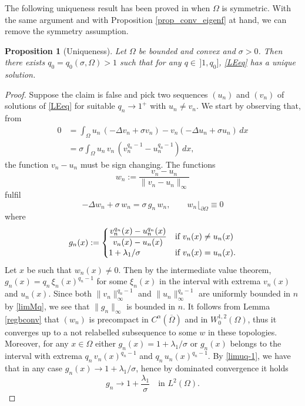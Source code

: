 \documentclass[12pt]{amsart}
\numberwithin{equation}{section}
\theoremstyle{plain}
\theoremstyle{plain}
\newtheorem{proposition}[theorem]{Proposition}
\theoremstyle{plain}
\theoremstyle{definition}
\newcommand{\beq}{\begin{equation}}
\newcommand{\eeq}{\end{equation}}
\begin{document}
\smallskip

The following uniqueness result has been proved in \cite{DGP99} when $\Omega$ is symmetric. With the same argument and with Proposition \ref{prop_conv_eigenf} at hand, we can remove the symmetry assumption.

\begin{proposition}[Uniqueness]
\label{corol_uniq}
Let $\Omega$ be bounded and convex and $\sigma>0$. 
Then there exists $q_0=q_0(\sigma, \Omega)>1$ such that for any $q\in \, ]1, q_0]$, \eqref{LEeq} has a unique solution.
\end{proposition}

\begin{proof}
Suppose the claim is false and pick two sequences $(u_n)$ and $(v_n)$ of solutions of \eqref{LEeq} for suitable $q_n\to 1^+$ with $u_n\ne v_n$. 
We start by observing that, from 
\[
\begin{split}
0&=\int_\Omega u_n\, (-\Delta v_n+\sigma v_n)- v_n(-\Delta u_n+\sigma u_n)\, dx\\
&=\sigma \int_\Omega u_n\, v_n\, (v_n^{q_n-1}-u_n^{q_n-1})\, dx,
\end{split}
\]
the function $v_n-u_n$ must be sign changing. 
The functions 
\[
w_n:=\frac{v_n-u_n}{\|v_n-u_n\|_\infty}
\]
fulfil
\beq
\label{eqwn}
-\Delta w_n +\sigma\, w_n=\sigma\, g_n\, w_n, \qquad w_n\lfloor_{\partial\Omega}\equiv 0
\eeq
where
\[
g_n(x):=
\begin{cases}\dfrac{v_n^{q_n}(x)-u_n^{q_n}(x)}{v_n(x)-u_n(x)}&\text{if $v_n(x)\ne u_n(x)$}\\
1+\lambda_1/\sigma&\text{if $ v_n(x)=u_n(x)$}.
\end{cases}
\]
Let $x$ be such that $w_n(x)\ne 0$. 
Then by the intermediate value theorem, $g_n(x)= q_n\, \xi_n(x)^{q_n-1}$ for some $\xi_n(x)$ in the interval with extrema $v_n(x)$ and $u_n(x)$. 
Since both $\|v_n\|_\infty^{q_n-1}$ and $\|u_n\|_{\infty}^{q_n-1}$ are uniformly bounded in $n$ by \eqref{limMq}, we see that $\|g_n\|_\infty$ is bounded in $n$. 
It follows from Lemma \ref{regbconv} that $(w_n)$ is precompact in $C^\alpha(\overline{\Omega})$ and in $W^{1,2}_0(\Omega)$, thus it converges up to a not relabelled subsequence to some $w$ in these topologies.
Moreover, for any $x\in \Omega$ either $g_n(x)=1+\lambda_1/\sigma$ or $g_n(x)$ belongs to the interval with extrema $q_n\, v_n(x)^{q_n-1}$ and $q_n\, u_n(x)^{q_n-1}$. By \eqref{limuq-1}, we have that in any case $g_n(x)\to 1+\lambda_1/\sigma$, hence by dominated convergence it holds 
\[
g_n\to 1+\frac{\lambda_1}{\sigma}\quad \text{in $L^2(\Omega)$}.
\]
\end{proof}
\end{document}
